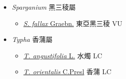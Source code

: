 
  \begin{itemize}
 \item[] \textit{Sparganium} 黑三稜屬
                    
  \begin{itemize}
        \item[] \href{http://www.theplantlist.org/tpl1.1/search?q=Sparganium+fallax}{\textit{S. fallax} Graebn.}   東亞黑三稜 VU
  \end{itemize}
 \item[] \textit{Typha} 香蒲屬
                    
  \begin{itemize}
        \item[] \href{http://www.theplantlist.org/tpl1.1/search?q=Typha+angustifolia}{\textit{T. angustifolia} L.}   水燭 LC
        \item[] \href{http://www.theplantlist.org/tpl1.1/search?q=Typha+orientalis}{\textit{T. orientalis} C.Presl}   香蒲 LC
  \end{itemize}
  \end{itemize}
